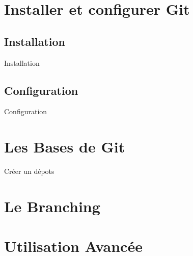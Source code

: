 \documentclass{beamer}
\begin{document}
\section{Installer et configurer Git}

\subsection*{Installation}
\begin{frame}{Installation}
\end{frame}

\subsection*{Configuration}
\begin{frame}{Configuration}
\end{frame}

\section{Les Bases de Git}
\begin{frame}{Créer un dépots}
\end{frame}

\section{Le Branching}
\begin{frame}{}
\end{frame}

\section{Utilisation Avancée}
\begin{frame}{}
\end{frame}
\end{document}
